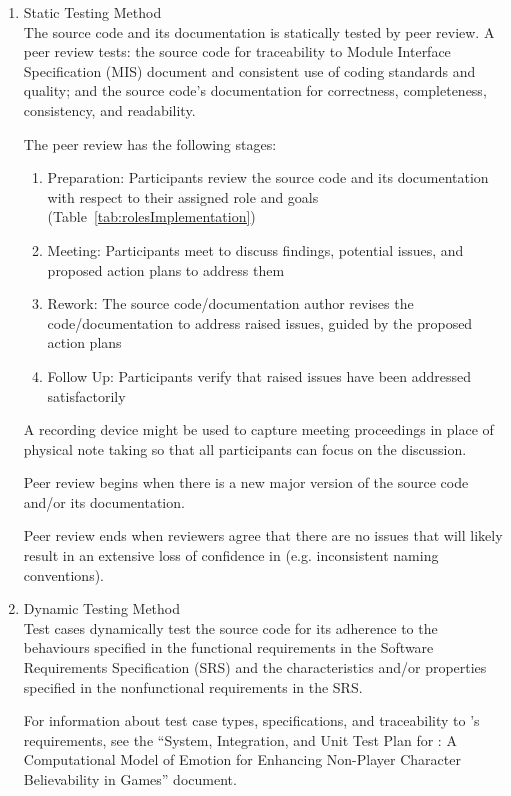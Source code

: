 \begin{enumerate}

    \item Static Testing Method \\
    The source code and its documentation is statically tested by peer review.
    A peer review tests: the source code for traceability to Module Interface
    Specification (MIS) document and consistent use of coding standards and
    quality; and the source code's documentation for correctness, completeness,
    consistency, and readability.

    The peer review has the following stages:
    \begin{enumerate}

        \item Preparation: Participants review the source code and its
        documentation with respect to their assigned role and goals
        (Table~\ref{tab:rolesImplementation})

        \item Meeting: Participants meet to discuss findings, potential issues,
        and proposed action plans to address them

        \item Rework: The source code/documentation author revises the
        code/documentation to address raised issues, guided by the proposed
        action plans

        \item Follow Up: Participants verify that raised issues have been
        addressed satisfactorily

    \end{enumerate}

    A recording device might be used to capture meeting proceedings in place of
    physical note taking so that all participants can focus on the discussion.

    Peer review begins when there is a new major version of the source code
    and/or its documentation.

    Peer review ends when reviewers agree that there are no issues that will
    likely result in an extensive loss of confidence in \progname{} (e.g.
    inconsistent naming conventions).

    \item Dynamic Testing Method \\
    Test cases dynamically test the source code for its adherence to the
    behaviours specified in the functional requirements in the Software
    Requirements Specification (SRS) and the characteristics and/or properties
    specified in the nonfunctional requirements in the SRS.

    For information about test case types, specifications, and traceability to
    \progname{}'s requirements, see the ``System, Integration, and Unit Test
    Plan for \progname{}: A Computational Model of Emotion for Enhancing
    Non-Player Character Believability in Games'' document.

\end{enumerate}

